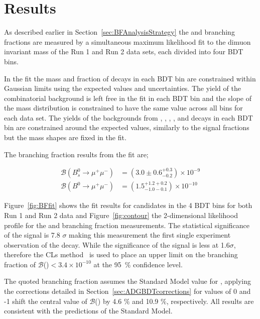 {{{\section{Results}
\label{sec:BFResults}

As described earlier in Section~\ref{sec:BFAnalysisStrategy} the \bsmumu and \bmumu branching fractions are measured by a simultaneous maximum likelihood fit to the dimuon invariant mass of the Run 1 and Run 2 data sets, each divided into four BDT bins. 

In the fit the mass \pdfs and fraction of \bmumu decays in each BDT bin are constrained within Gaussian limits using the expected values and uncertainties. The yield of the combinatorial background is left free in the fit in each BDT bin and the slope of the mass distribution is constrained to have the same value across all bins for each data set. The yields of the backgrounds from \bhh, \bdpimunu, \bsKmunu, \bpimumu, \bdpimumu and \bcjpsimunu decays in each BDT bin are constrained around the expected values, similarly to the signal fractions but the mass shapes are fixed in the fit.

The branching fraction results from the fit are;

\begin{equation}
\begin{split}
  \mathcal{B}(B^{0}_{s} \to \mu^{+} \mu^{-}) &= (3.0 \pm 0.6^{+0.3}_{-0.2}) \times 10^{-9} \\
  \mathcal{B}(B^{0} \to \mu^{+} \mu^{-}) &= (1.5^{+1.2 +0.2}_{-1.0 -0.1})    \times 10^{-10} 
\end{split}
\label{eq:BFresults}
\end{equation}

Figure~\ref{fig:BFfit} shows the fit results for \bmumu candidates in the 4 BDT bins for both Run 1 and Run 2 data and Figure~\ref{fig:contour} the 2-dimensional likelihood profile for the \bdmumu and \bsmumu branching fraction measurements.
The statistical significance of the \bsmumu signal is 7.8 $\sigma$ making this measurement the first single experiment observation of the \bsmumu decay. While the significance of the \bdmumu signal is less at 1.6$\sigma$, therefore the CLs method~\cite{} is used to place an upper limit on the branching fraction of $\mathcal{B}$(\bdmumu)$ < 3.4 \times 10^{-10}$  at the 95~$\%$ confidence level.

The quoted \bsmumu branching fraction assumes the Standard Model value for \ADG, applying the corrections detailed in Section~\ref{sec:ADGBDTcorrections} for \ADG values of 0 and -1 shift the central value of $\mathcal{B}$(\bsmumu) by 4.6 $\%$ and 10.9 $\%$, respectively. All results are consistent with the predictions of the Standard Model.



}}}
